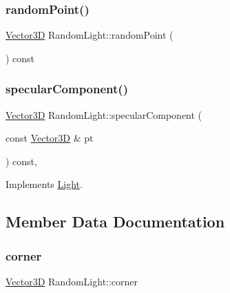 \subsubsection{\texorpdfstring{randomPoint()}{randomPoint()}}
{\footnotesize\ttfamily \mbox{\hyperlink{classVector3D}{Vector3D}} Random\+Light\+::random\+Point (\begin{DoxyParamCaption}{ }\end{DoxyParamCaption}) const\hspace{0.3cm}{\ttfamily [private]}}

\mbox{\label{classRandomLight_af9922ba2ce0c9dc16026db945d8f1506}} 
\subsubsection{\texorpdfstring{specularComponent()}{specularComponent()}}
{\footnotesize\ttfamily \mbox{\hyperlink{classVector3D}{Vector3D}} Random\+Light\+::specular\+Component (\begin{DoxyParamCaption}\item[{const \mbox{\hyperlink{classVector3D}{Vector3D}} \&}]{pt }\end{DoxyParamCaption}) const\hspace{0.3cm}{\ttfamily [override]}, {\ttfamily [virtual]}}



Implements \mbox{\hyperlink{classLight_a2a4cdf8081c2cab02757c2464610a32f}{Light}}.



\subsection{Member Data Documentation}
\mbox{\label{classRandomLight_ac54b3aa2ddb79d7f7363f64ed0f96989}} 
\subsubsection{\texorpdfstring{corner}{corner}}
{\footnotesize\ttfamily \mbox{\hyperlink{classVector3D}{Vector3D}} Random\+Light\+::corner\hspace{0.3cm}{\ttfamily [private]}}

